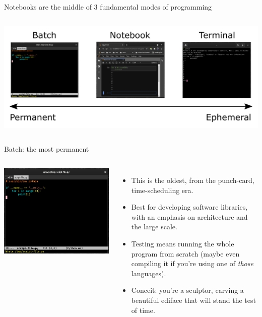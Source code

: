\documentclass[aspectratio=169]{beamer}
\begin{document}
\begin{frame}{Notebooks are the middle of 3 fundamental modes of programming}
\vspace{0.2 cm}
\begin{columns}
\column{\linewidth}
\includegraphics[width=\linewidth]{../img/fundamental-3-modes-of-programming.pdf}
\end{columns}
\end{frame}

\begin{frame}{Batch: the most permanent}
\vspace{0.2 cm}
\begin{columns}
\includegraphics[width=\linewidth]{../img/fundamental-3-modes-batch.png}

\large
\begin{itemize}\setlength{\itemsep}{0.25 cm}
\item<1-> This is the oldest, from the punch-card, time-scheduling era.
\item<2-> Best for developing software libraries, with an emphasis on architecture and the large scale.
\item<3-> Testing means running the whole program from scratch (maybe even compiling it if you're using one of {\it those} languages).
\item<4-> Conceit: you're a sculptor, carving a beautiful ediface that will stand the test of time.
\end{itemize}
\end{columns}
\end{frame}
\end{document}
